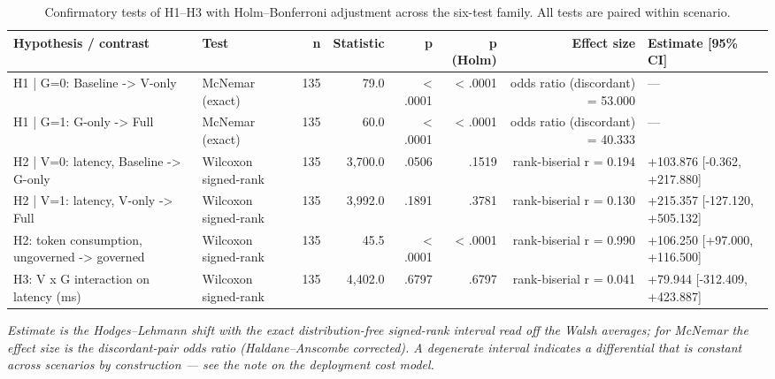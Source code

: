 \begin{table}[htbp]
\centering
\small
\caption{Confirmatory tests of H1–H3 with Holm–Bonferroni adjustment across the six-test family. All tests are paired within scenario.}
\label{tab:gmais-4}
\begin{tabular}{llrrrrrl}
\toprule
Hypothesis / contrast & Test & n & Statistic & p & p (Holm) & Effect size & Estimate [95\% CI] \\
\midrule
H1 | G=0: Baseline -> V-only & McNemar (exact) & 135 & 79.0 & < .0001 & < .0001 & odds ratio (discordant) = 53.000 & --- \\
H1 | G=1: G-only -> Full & McNemar (exact) & 135 & 60.0 & < .0001 & < .0001 & odds ratio (discordant) = 40.333 & --- \\
H2 | V=0: latency, Baseline -> G-only & Wilcoxon signed-rank & 135 & 3,700.0 & .0506 & .1519 & rank-biserial r = 0.194 & +103.876 [-0.362, +217.880] \\
H2 | V=1: latency, V-only -> Full & Wilcoxon signed-rank & 135 & 3,992.0 & .1891 & .3781 & rank-biserial r = 0.130 & +215.357 [-127.120, +505.132] \\
H2: token consumption, ungoverned -> governed & Wilcoxon signed-rank & 135 & 45.5 & < .0001 & < .0001 & rank-biserial r = 0.990 & +106.250 [+97.000, +116.500] \\
H3: V x G interaction on latency (ms) & Wilcoxon signed-rank & 135 & 4,402.0 & .6797 & .6797 & rank-biserial r = 0.041 & +79.944 [-312.409, +423.887] \\
\bottomrule
\end{tabular}
\par\vspace{2pt}\footnotesize\emph{Estimate is the Hodges–Lehmann shift with the exact distribution-free signed-rank interval read off the Walsh averages; for McNemar the effect size is the discordant-pair odds ratio (Haldane–Anscombe corrected). A degenerate interval indicates a differential that is constant across scenarios by construction --- see the note on the deployment cost model.}
\end{table}
